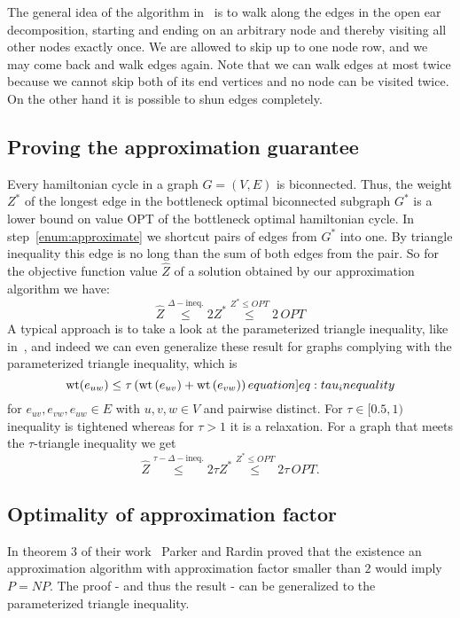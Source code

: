 The general idea of the algorithm in~\cite{alstrup2018hamiltonian} is to walk along the edges in the open ear decomposition, starting and ending on an arbitrary node and thereby visiting all other nodes exactly once. We are allowed to skip up to one node row, and we may come back and walk edges again. Note that we can walk edges at most twice because we cannot skip both of its end vertices and no node can be visited twice. On the other hand it is possible to shun edges completely.

\subsection{Proving the approximation guarantee}
Every hamiltonian cycle in a graph \(G = (V, E)\) is biconnected. Thus, the weight \(Z^\ast\) of the longest edge in the bottleneck optimal biconnected subgraph \(G^\ast\) is a lower bound on value OPT of the bottleneck optimal hamiltonian cycle. In step~\ref{enum:approximate} we shortcut pairs of edges from \(G^\ast\) into one. By triangle inequality this edge is no long than the sum of both edges from the pair.
So for the objective function value \(\hat{Z}\) of a solution obtained by our approximation algorithm we have:
\begin{equation}
  \hat{Z} \stackrel{\Delta-\text{ineq.}}{\leq} 2 Z^\ast \stackrel{Z^\ast \leq OPT}{\leq} 2 \, OPT
\end{equation}
A typical approach is to take a look at the parameterized triangle inequality, like in~\cite{bender1999generalizedTriangle}, and indeed we can even generalize these result for graphs complying with the parameterized triangle inequality, which is
\begin{equation}
  \wt(e_{uw}) \leq \tau \left(\wt\left(e_{uv}\right) + \wt\left(e_{vw}\right)\right)\label[equation]{eq:tau_inequality}
\end{equation}
for \(e_{uv}, e_{vw}, e_{uw} \in E\) with \(u,v,w \in V\) and pairwise distinct. For \(\tau \in [0.5,1)\) inequality is tightened whereas for \(\tau > 1\) it is a relaxation.
For a graph that meets the \(\tau\)-triangle inequality we get
\begin{equation}
  \hat{Z} \stackrel{\tau-\Delta-\text{ineq.}}{\leq} 2 \tau Z^\ast \stackrel{Z^\ast \leq OPT}{\leq} 2 \tau \, OPT.
\end{equation}

\subsection{Optimality of approximation factor}
In theorem 3 of their work~\cite{ParkerRardin1984} Parker and Rardin proved that the existence an approximation algorithm with approximation factor smaller than \(2\) would imply \(P = NP\). The proof - and thus the result - can be generalized to the parameterized triangle inequality.

